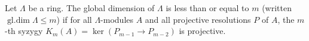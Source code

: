 Let $\Lambda$ be a ring. The global dimension of $\Lambda$ is less than or equal to $m$ (written $\operatorname{gl. dim} \Lambda \leq m$) if for all $\Lambda$-modules $A$ and all projective resolutions $P$ of $A$, the $m$-th syzygy $K_m(A) = \ker(P_{m-1} \rightarrow P_{m-2})$ is projective.
